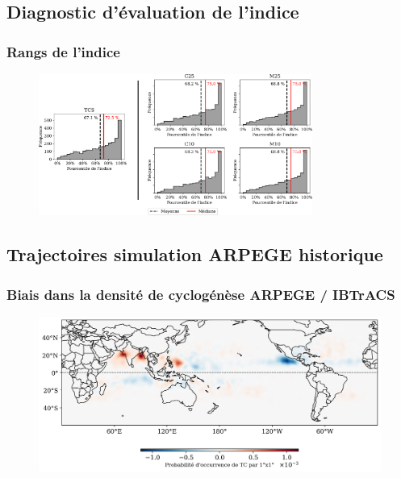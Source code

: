 \documentclass[aspectratio=169, usepdftitle=false, xcolor={dvipsnames}, 9pt,table]{beamer}
\begin{document}
\subsection*{Diagnostic d'évaluation de l'indice}
\begin{frame}[c]
    \frametitle{Rangs de l'indice}
    \begin{figure}
        \centering
        \includegraphics[width=0.8\textwidth]{Figures/Annexes/percentile_genesis_all_5_2.png}
    \end{figure} 
\end{frame}


\subsection*{Trajectoires simulation ARPEGE historique}
\begin{frame}[c]
    \frametitle{Biais dans la densité de cyclogénèse ARPEGE / IBTrACS}
    \begin{figure}
        \centering
        \includegraphics[width=\textwidth]{Figures/Annexes/density_arpege_ibtracs.png}
    \end{figure}
    
\end{frame}

\end{document}
